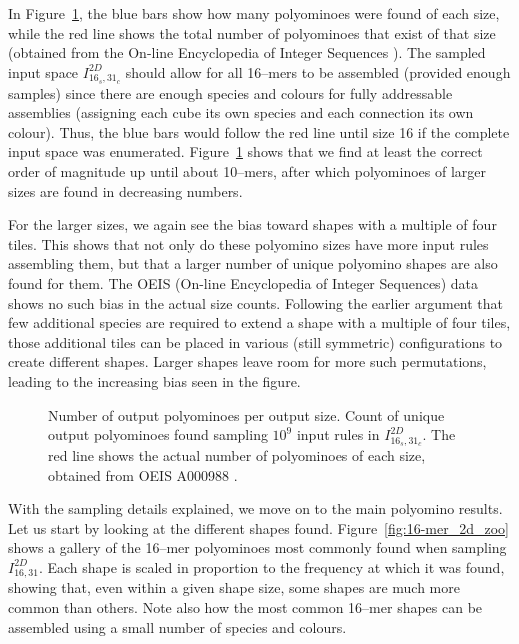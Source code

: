 In Figure~\ref{fig:ref_outputdistr}, the blue bars show how many polyominoes were found of each size, while the red line shows the total number of polyominoes that exist of that size (obtained from the On-line Encyclopedia of Integer Sequences \cite{sloane1995encyclopedia, oeisA000988}). The sampled input space \(I_{16_s,31_c}^{2D}\) should allow for all 16--mers to be assembled (provided enough samples) since there are enough species and colours for fully addressable assemblies (assigning each cube its own species and each connection its own colour). Thus, the blue bars would follow the red line until size 16 if the complete input space was enumerated. Figure~\ref{fig:ref_outputdistr} shows that we find at least the correct order of magnitude up until about 10--mers, after which polyominoes of larger sizes are found in decreasing numbers.

For the larger sizes, we again see the bias toward shapes with a multiple of four tiles. This shows that not only do these polyomino sizes have more input rules assembling them, but that a larger number of unique polyomino shapes are also found for them. The OEIS (On-line Encyclopedia of Integer Sequences) data shows no such bias in the actual size counts. Following the earlier argument that few additional species are required to extend a shape with a multiple of four tiles, those additional tiles can be placed in various (still symmetric) configurations to create different shapes. Larger shapes leave room for more such permutations, leading to the increasing bias seen in the figure.

\begin{figure}[h]
    \centering
    \caption{Number of output polyominoes per output size. Count of unique output polyominoes found sampling \(10^9\) input rules in \(I_{16_s,31_c}^{2D}\). The red line shows the actual number of polyominoes of each size, obtained from OEIS A000988 \cite{sloane1995encyclopedia, oeisA000988}.
    }
    \label{fig:ref_outputdistr}
\end{figure}

With the sampling details explained, we move on to the main polyomino results. Let us start by looking at the different shapes found. Figure~\ref{fig:16-mer_2d_zoo} shows a gallery of the 16--mer polyominoes most commonly found when sampling \(I_{16,31}^{2D}\). Each shape is scaled in proportion to the frequency at which it was found, showing that, even within a given shape size, some shapes are much more common than others. Note also how the most common 16--mer shapes can be assembled using a small number of species and colours.


